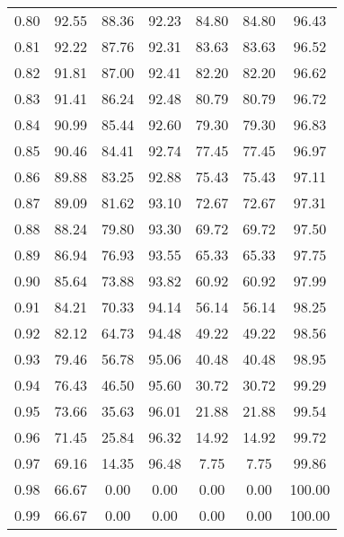 \begin{tabular}{|c|c|c|c|c|c|c|}
      0.80 &     92.55 &     88.36 &      92.23 &   84.80 &      84.80 &         96.43 \\
      0.81 &     92.22 &     87.76 &      92.31 &   83.63 &      83.63 &         96.52 \\
      0.82 &     91.81 &     87.00 &      92.41 &   82.20 &      82.20 &         96.62 \\
      0.83 &     91.41 &     86.24 &      92.48 &   80.79 &      80.79 &         96.72 \\
      0.84 &     90.99 &     85.44 &      92.60 &   79.30 &      79.30 &         96.83 \\
      0.85 &     90.46 &     84.41 &      92.74 &   77.45 &      77.45 &         96.97 \\
      0.86 &     89.88 &     83.25 &      92.88 &   75.43 &      75.43 &         97.11 \\
      0.87 &     89.09 &     81.62 &      93.10 &   72.67 &      72.67 &         97.31 \\
      0.88 &     88.24 &     79.80 &      93.30 &   69.72 &      69.72 &         97.50 \\
      0.89 &     86.94 &     76.93 &      93.55 &   65.33 &      65.33 &         97.75 \\
      0.90 &     85.64 &     73.88 &      93.82 &   60.92 &      60.92 &         97.99 \\
      0.91 &     84.21 &     70.33 &      94.14 &   56.14 &      56.14 &         98.25 \\
      0.92 &     82.12 &     64.73 &      94.48 &   49.22 &      49.22 &         98.56 \\
      0.93 &     79.46 &     56.78 &      95.06 &   40.48 &      40.48 &         98.95 \\
      0.94 &     76.43 &     46.50 &      95.60 &   30.72 &      30.72 &         99.29 \\
      0.95 &     73.66 &     35.63 &      96.01 &   21.88 &      21.88 &         99.54 \\
      0.96 &     71.45 &     25.84 &      96.32 &   14.92 &      14.92 &         99.72 \\
      0.97 &     69.16 &     14.35 &      96.48 &    7.75 &       7.75 &         99.86 \\
      0.98 &     66.67 &      0.00 &       0.00 &    0.00 &       0.00 &        100.00 \\
      0.99 &     66.67 &      0.00 &       0.00 &    0.00 &       0.00 &        100.00 \\
\bottomrule
\end{tabular}
